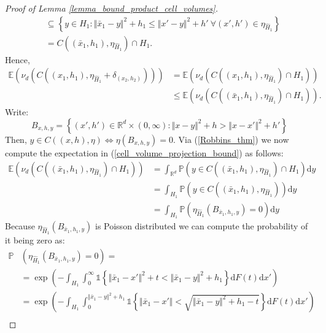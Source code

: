 \documentclass{article}
\newcommand{\RR}{\mathbb{R}}
\newcommand{\PP}{\mathbb{P}}
\newcommand{\EE}{\mathbb{E}}
\theoremstyle{plain}
\theoremstyle{remark}
\theoremstyle{definition}
\begin{document}
\begin{proof}[Proof of Lemma \ref{lemma_bound_product_cell_volumes}]
\begin{align}
        &\subseteq \left\{y \in H_1: \Vert \bar{x}_1 - y\Vert^2 + h_1 \leq  \Vert x' - y\Vert^2 + h' \ \forall (x',h') \in \eta_{\hat{H}_1} \right\}\nonumber \\
        &= C\left((\bar{x}_1,h_1),\eta_{\hat{H}_1}\right) \cap H_1. \nonumber
    \end{align}
    Hence,
    \begin{align}
        \EE\left(\nu_d\left(C\left((x_1,h_1),\eta_{\hat{H}_1}+\delta_{(x_2,h_2)}\right)\right)\right) &=  \EE\left(\nu_d\left(C\left((x_1,h_1),\eta_{\hat{H}_1}\right)\cap H_1\right)\right)\nonumber \\
        &\leq  \EE\left(\nu_d\left(C\left((\bar{x}_1,h_1),\eta_{\hat{H}_1}\right)\cap H_1\right)\right) \label{cell_volume_projection_bound}.
    \end{align}
    Write:
    \[B_{x,h,y} = \left\{(x',h')\in \RR^d \times (0,\infty): \Vert x - y \Vert^2 +h > \Vert x- x'\Vert^2 + h' \right\}\]
    Then, $y \in C((x,h),\eta) \iff \eta(B_{x,h,y}) = 0$. Via (\ref{Robbins_thm}) we now compute the expectation in (\ref{cell_volume_projection_bound}) as follows:
    \begin{align}
        \EE\left(\nu_d\left(C\left((\bar{x}_1,h_1),\eta_{\hat{H}_1}\right)\cap H_1\right)\right) &= \int_{\RR^d} \PP\left(y \in C\left((\bar{x}_1,h_1),\eta_{\hat{H}_1}\right)\cap H_1\right)\mathrm{d}y \nonumber \\
        &= \int_{H_1} \PP\left(y \in C\left((\bar{x}_1,h_1),\eta_{\hat{H}_1}\right)\right)\mathrm{d}y \nonumber \\
        &=\int_{H_1} \PP\left(\eta_{\hat{H}_1}\left(B_{\bar{x}_1,h_1,y} \right) = 0 \right)\mathrm{d}y \label{capped_cell_expected_volume}
    \end{align}
    Because $\eta_{\hat{H}_1}\left(B_{\bar{x}_1,h_1,y} \right)$ is Poisson distributed we can compute the probability of it being zero as:
    {\allowdisplaybreaks
    \begin{align}
        \PP&\left(\eta_{\hat{H}_1}\left(B_{\bar{x}_1,h_1,y} \right) = 0 \right) = \nonumber\\
        &=\exp\left(-\int_{H_1}\int_0^\infty \mathds{1}\left\{\Vert \bar{x}_1 - x'\Vert^2 + t < \Vert\bar{x}_1 - y \Vert^2 + h_1\right\}\mathrm{d}F(t)\mathrm{d}x'\right) \nonumber \\
        &= \exp\left(-\int_{H_1}\int_0^{\Vert\bar{x}_1 - y \Vert^2 + h_1} \mathds{1}\left\{\Vert \bar{x}_1 - x'\Vert < \sqrt{\Vert\bar{x}_1 - y \Vert^2 + h_1 - t}\right\}\mathrm{d}F(t)\mathrm{d}x'\right) \nonumber\\

\end{align}}
\end{proof}
\end{document}
